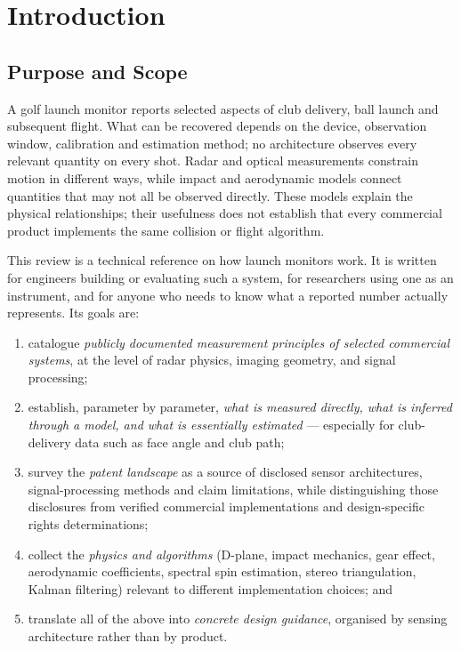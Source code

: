 \chapter{Introduction}
\label{ch:intro}

\section{Purpose and Scope}

A golf launch monitor reports selected aspects of club delivery, ball launch and subsequent flight.
What can be recovered depends on the device, observation window, calibration and estimation method; no architecture observes every relevant quantity on every shot.
Radar and optical measurements constrain motion in different ways, while impact and aerodynamic models connect quantities that may not all be observed directly.
These models explain the physical relationships; their usefulness does not establish that every commercial product implements the same collision or flight algorithm.

This review is a technical reference on how launch monitors work. It is
written for engineers building or evaluating such a system, for researchers
using one as an instrument, and for anyone who needs to know what a reported
number actually represents. Its goals are:

\begin{enumerate}[itemsep=2pt]
  \item catalogue \emph{publicly documented measurement principles of selected commercial systems}, at the level
        of radar physics, imaging geometry, and signal processing;
  \item establish, parameter by parameter, \emph{what is measured directly,
        what is inferred through a model, and what is essentially
        estimated} --- especially for club-delivery data such as face angle
        and club path;
  \item survey the \emph{patent landscape} as a source of disclosed sensor architectures, signal-processing methods and claim limitations, while distinguishing those disclosures from verified commercial implementations and design-specific rights determinations;
  \item collect the \emph{physics and algorithms} (D-plane, impact mechanics,
        gear effect, aerodynamic coefficients, spectral spin estimation,
        stereo triangulation, Kalman filtering) relevant to different implementation choices; and
  \item translate all of the above into \emph{concrete design guidance},
        organised by sensing architecture rather than by product.
\end{enumerate}


